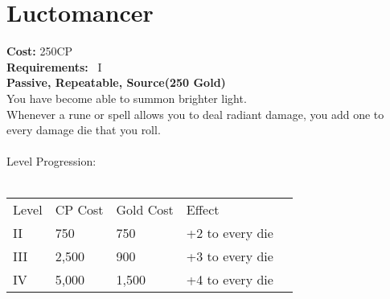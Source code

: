 \section{Luctomancer}\label{perk:luctomancer}
\textbf{Cost:} 250CP\\
\textbf{Requirements:}~ I\\
\textbf{Passive, Repeatable, Source(250 Gold)}\\
You have become able to summon brighter light.\\
Whenever a rune or spell allows you to deal radiant damage, you add one to every damage die that you roll.\\
\\
Level Progression:\\
\\
\begin{tabular}{l | l | l | l | l}
    Level & CP Cost & Gold Cost &  Effect\\
    II & 750 & 750 & +2 to every die\\
    III & 2,500 & 900 & +3 to every die\\
    IV & 5,000 & 1,500 & +4 to every die\\
\end{tabular}